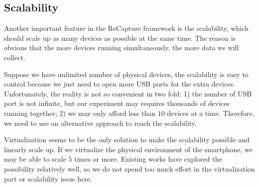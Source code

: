 \subsection{Scalability}
Another important feature in the ReCapture framework is the scalability, which should scale up as many devices as possible at the same time. The reason is obvious that the more devices running simultaneously, the more data we will collect.

Suppose we have unlimited number of physical devices, the scalability is easy to control because we just need to open more USB ports for the extra devices. Unfortunately, the reality is not so convenient in two fold: 1) the number of USB port is not infinite, but our experiment may requires thousands of devices running together; 2) we may only afford less than $10$ devices at a time. Therefore, we need to use an alternative approach to reach the scalability.

Virtualization seems to be the only solution to make the scalability possible and linearly scale up. If we virtualize the physical environment of the smartphone, we may be able to scale $5$ times or more. Existing works have explored the possibility relatively well, so we do not spend too much effort in the virtualization part or scalability issue here.
